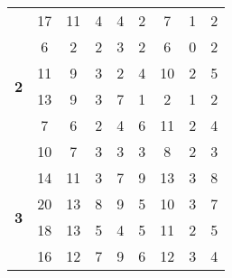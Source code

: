 \begin{table}[!htbp]
\begin{adjustbox}{angle=90}
\begin{tabular}{ccccccccc}
			\multicolumn{1}{c|}{\multirow{6}{*}{\textbf{2}}} & \multicolumn{1}{c|}{17} & \multicolumn{1}{c|}{11} & \multicolumn{1}{c|}{4} & \multicolumn{1}{c|}{4} & \multicolumn{1}{c|}{2} & \multicolumn{1}{c|}{7} & \multicolumn{1}{c|}{1} & 2 \\
			\multicolumn{1}{c|}{} & \multicolumn{1}{c|}{6} & \multicolumn{1}{c|}{2} & \multicolumn{1}{c|}{2} & \multicolumn{1}{c|}{3} & \multicolumn{1}{c|}{2} & \multicolumn{1}{c|}{6} & \multicolumn{1}{c|}{0} & 2 \\
			\multicolumn{1}{c|}{} & \multicolumn{1}{c|}{11} & \multicolumn{1}{c|}{9} & \multicolumn{1}{c|}{3} & \multicolumn{1}{c|}{2} & \multicolumn{1}{c|}{4} & \multicolumn{1}{c|}{10} & \multicolumn{1}{c|}{2} & 5 \\
			\multicolumn{1}{c|}{} & \multicolumn{1}{c|}{13} & \multicolumn{1}{c|}{9} & \multicolumn{1}{c|}{3} & \multicolumn{1}{c|}{7} & \multicolumn{1}{c|}{1} & \multicolumn{1}{c|}{2} & \multicolumn{1}{c|}{1} & 2 \\
			\multicolumn{1}{c|}{} & \multicolumn{1}{c|}{7} & \multicolumn{1}{c|}{6} & \multicolumn{1}{c|}{2} & \multicolumn{1}{c|}{4} & \multicolumn{1}{c|}{6} & \multicolumn{1}{c|}{11} & \multicolumn{1}{c|}{2} & 4 \\
			\multicolumn{1}{c|}{} & \multicolumn{1}{c|}{10} & \multicolumn{1}{c|}{7} & \multicolumn{1}{c|}{3} & \multicolumn{1}{c|}{3} & \multicolumn{1}{c|}{3} & \multicolumn{1}{c|}{8} & \multicolumn{1}{c|}{2} & 3 \\ \hline
			
			
			\multicolumn{1}{c|}{\multirow{4}{*}{\textbf{3}}} & \multicolumn{1}{c|}{14} & \multicolumn{1}{c|}{11} & \multicolumn{1}{c|}{3} & \multicolumn{1}{c|}{7} & \multicolumn{1}{c|}{9} & \multicolumn{1}{c|}{13} & \multicolumn{1}{c|}{3} & 8 \\
			\multicolumn{1}{c|}{} & \multicolumn{1}{c|}{20} & \multicolumn{1}{c|}{13} & \multicolumn{1}{c|}{8} & \multicolumn{1}{c|}{9} & \multicolumn{1}{c|}{5} & \multicolumn{1}{c|}{10} & \multicolumn{1}{c|}{3} & 7 \\
			\multicolumn{1}{c|}{} & \multicolumn{1}{c|}{18} & \multicolumn{1}{c|}{13} & \multicolumn{1}{c|}{5} & \multicolumn{1}{c|}{4} & \multicolumn{1}{c|}{5} & \multicolumn{1}{c|}{11} & \multicolumn{1}{c|}{2} & 5 \\
			\multicolumn{1}{c|}{} & \multicolumn{1}{c|}{16} & \multicolumn{1}{c|}{12} & \multicolumn{1}{c|}{7} & \multicolumn{1}{c|}{9} & \multicolumn{1}{c|}{6} & \multicolumn{1}{c|}{12} & \multicolumn{1}{c|}{3} & 4 \\ \hline
			

\end{tabular}
\end{adjustbox}
\end{table}
